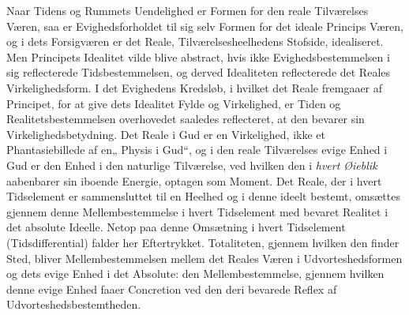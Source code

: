 Naar Tidens og Rummets Uendelighed er Formen for den reale Tilværelses Væren,
saa er Evighedsforholdet til sig selv Formen for det ideale Princips Væren, og
i dets Forsigværen er det Reale, Tilværelsesheelhedens Stofside, idealiseret.
Men Principets Idealitet vilde blive abstract, hvis ikke Evighedsbestemmelsen i
sig reflecterede Tidsbestemmelsen, og derved Idealiteten reflecterede det
Reales Virkelighedsform. I det Evighedens Kredsløb, i hvilket det Reale
fremgaaer af Principet, for at give dets Idealitet Fylde og Virkelighed, er
Tiden og Realitetsbestemmelsen overhovedet saaledes reflecteret, at den bevarer
sin Virkelighedsbetydning. Det Reale i Gud er en Virkelighed, ikke et
Phantasiebillede af en„ Physis i Gud“, og i den reale Tilværelses evige Enhed i
Gud er den Enhed i den naturlige Tilværelse, ved hvilken den i \emph{hvert
Øieblik} aabenbarer sin iboende Energie, optagen som Moment. Det Reale, der i
hvert Tidselement er sammensluttet til en Heelhed og i denne ideelt bestemt,
omsættes gjennem denne Mellembestemmelse i hvert Tidselement med bevaret
Realitet i det absolute Ideelle. Netop paa denne Omsætning i hvert Tidselement
(Tidsdifferential) falder her Eftertrykket. Totaliteten, gjennem hvilken den
finder Sted, bliver Mellembestemmelsen mellem det Reales Væren i
Udvorteshedsformen og dets evige Enhed i det Absolute: den Mellembestemmelse,
gjennem hvilken denne evige Enhed faaer Concretion ved den deri bevarede Reflex
af Udvorteshedsbestemtheden.

